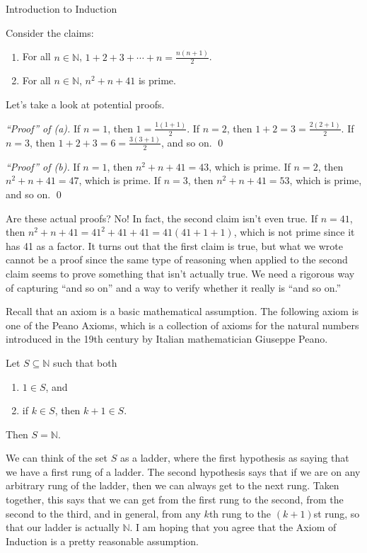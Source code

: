\begin{section}{Introduction to Induction}

Consider the claims:
\begin{enumerate}[label=\textrm{(\alph*)}]
\item For all $n\in\mathbb{N}$, $\displaystyle 1+2+3+\cdots +n=\frac{n(n+1)}{2}$.
\item For all $n\in\mathbb{N}$, $n^{2}+n+41$ is prime.
\end{enumerate}
Let's take a look at potential proofs.

\bigskip

\noindent \emph{``Proof'' of (a).} If $n=1$, then $1=\frac{1(1+1)}{2}$.  If $n=2$, then $1+2=3=\frac{2(2+1)}{2}$.  If $n=3$, then $1+2+3=6=\frac{3(3+1)}{2}$, and so on. \hfill \qed

\bigskip

\noindent \emph{``Proof'' of (b).} If $n=1$, then $n^{2}+n+41=43$, which is prime.  If $n=2$, then $n^{2}+n+41=47$, which is prime.  If $n=3$, then $n^{2}+n+41=53$, which is prime, and so on. \hfill \qed

\bigskip

Are these actual proofs?  No!  In fact, the second claim isn't even true.  If $n=41$, then $n^{2}+n+41=41^{2}+41+41=41(41+1+1)$, which is not prime since it has 41 as a factor.  It turns out that the first claim is true, but what we wrote cannot be a proof since the same type of reasoning when applied to the second claim seems to prove something that isn't actually true.  We need a rigorous way of capturing ``and so on'' and a way to verify whether it really is ``and so on.''

Recall that an axiom is a basic mathematical assumption.  The following axiom is one of the Peano Axioms, which is a collection of axioms for the natural numbers introduced in the 19th century by Italian mathematician Giuseppe Peano.

\begin{axiom}\label{axiom:induction}
Let $S\subseteq \mathbb{N}$ such that both
\begin{enumerate}[label=\textrm{(\roman*)}]
\item $1\in S$, and
\item if $k\in S$, then $k+1\in S$.
\end{enumerate}
Then $S=\mathbb{N}$.
\end{axiom}

We can think of the set $S$ as a ladder, where the first hypothesis as saying that we have a first rung of a ladder.  The second hypothesis says that if we are on any arbitrary rung of the ladder, then we can always get to the next rung.  Taken together, this says that we can get from the first rung to the second, from the second to the third, and in general, from any $k$th rung to the $(k+1)$st rung, so that our ladder is actually $\mathbb{N}$. I am hoping that you agree that the Axiom of Induction is a pretty reasonable assumption.  


\end{section}
